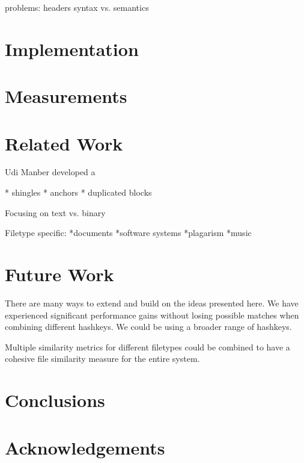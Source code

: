 \documentclass[10pt, twocolumn]{article}
\begin{document}
problems:
headers
syntax vs. semantics


\section{Implementation}

\section{Measurements}


\section{Related Work}

Udi Manber \cite{manber} developed a 

* shingles
* anchors
* duplicated blocks

Focusing on text vs. binary

Filetype specific:
*documents \cite{simFilesDocRep} 
*software systems \cite{yamamoto2005msl} 
*plagarism \cite{hoad2003miv} \cite{bernstein}
*music \cite{welsh99querying}



\section{Future Work}

There are many ways to extend and build on the ideas presented here. We have experienced significant performance gains without losing possible matches when combining different hashkeys. We could be using a broader range of hashkeys.

Multiple similarity metrics for different filetypes could be combined to have a cohesive file similarity measure for the entire system.

\section{Conclusions}

\section{Acknowledgements}


\end{document}
